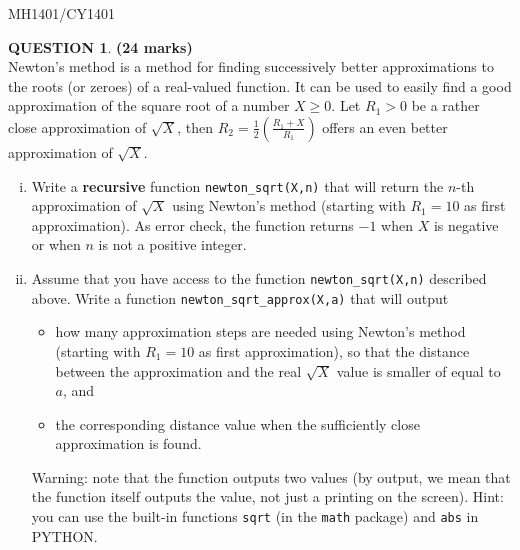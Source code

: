 \documentclass[a4paper,12pt]{article}
\theoremstyle{definition}
\newtheorem{ques}[dummy]{QUESTION}
\theoremstyle{plain}
\newcommand{\ttx}[1]{\texttt{#1}}
\newcommand{\bigbracket}[1]{\left( #1 \right)}
\begin{document}
\newpage

\hfill MH1401/CY1401\vspace*{0.5em}

\begin{ques}\hfill \textbf{(24 marks)}\vspace*{2em}\\
	Newton's method is a method for finding successively better approximations to the roots (or zeroes) of a real-valued function. It can be used to easily find a good approximation of the square root of a number $X\geq 0$. Let $R_1 > 0$ be a rather close approximation of $\sqrt{X}$, then $R_2 = \frac{1}{2}\bigbracket{\frac{R_1+X}{R_1}}$ offers an even better approximation of $\sqrt{X}$.
	
	\begin{enumerate}[(i)]
		\item Write a \textbf{recursive} function \ttx{newton\_sqrt(X,n)} that will return the $n$-th approximation of $\sqrt{X}$ using Newton's method (starting with $R_1 = 10$ as first approximation). As error check, the function returns $-1$ when $X$ is negative or when $n$ is not a positive integer.
		
		\item Assume that you have access to the function \ttx{newton\_sqrt(X,n)} described above. Write a function \ttx{newton\_sqrt\_approx(X,a)} that will output
		\begin{itemize}
			\item how many approximation steps are needed using Newton's method (starting with $R_1 = 10$ as first approximation), so that the distance between the approximation and the real $\sqrt{X}$ value is smaller of equal to $a$, and
			\item the corresponding distance value when the sufficiently close approximation is found.
		\end{itemize}
		Warning: note that the function outputs two values (by output, we mean that the function itself outputs the value, not just a printing on the screen). Hint: you can use the built-in functions \ttx{sqrt} (in the \texttt{math} package) and \ttx{abs} in PYTHON.
	\end{enumerate}
\end{ques}
\end{document}
